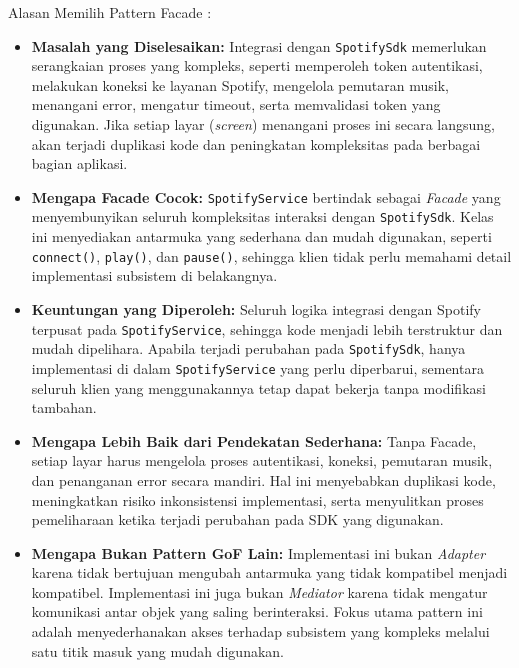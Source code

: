 \documentclass[11pt]{article}
\begin{document}
Alasan Memilih Pattern Facade :
\begin{itemize}

\item \textbf{Masalah yang Diselesaikan:} Integrasi dengan \texttt{SpotifySdk} memerlukan serangkaian proses yang kompleks, seperti memperoleh token autentikasi, melakukan koneksi ke layanan Spotify, mengelola pemutaran musik, menangani error, mengatur timeout, serta memvalidasi token yang digunakan. Jika setiap layar (\textit{screen}) menangani proses ini secara langsung, akan terjadi duplikasi kode dan peningkatan kompleksitas pada berbagai bagian aplikasi.

\item \textbf{Mengapa Facade Cocok:} \texttt{SpotifyService} bertindak sebagai \textit{Facade} yang menyembunyikan seluruh kompleksitas interaksi dengan \texttt{SpotifySdk}. Kelas ini menyediakan antarmuka yang sederhana dan mudah digunakan, seperti \texttt{connect()}, \texttt{play()}, dan \texttt{pause()}, sehingga klien tidak perlu memahami detail implementasi subsistem di belakangnya.

\item \textbf{Keuntungan yang Diperoleh:} Seluruh logika integrasi dengan Spotify terpusat pada \texttt{SpotifyService}, sehingga kode menjadi lebih terstruktur dan mudah dipelihara. Apabila terjadi perubahan pada \texttt{SpotifySdk}, hanya implementasi di dalam \texttt{SpotifyService} yang perlu diperbarui, sementara seluruh klien yang menggunakannya tetap dapat bekerja tanpa modifikasi tambahan.

\item \textbf{Mengapa Lebih Baik dari Pendekatan Sederhana:} Tanpa Facade, setiap layar harus mengelola proses autentikasi, koneksi, pemutaran musik, dan penanganan error secara mandiri. Hal ini menyebabkan duplikasi kode, meningkatkan risiko inkonsistensi implementasi, serta menyulitkan proses pemeliharaan ketika terjadi perubahan pada SDK yang digunakan.

\item \textbf{Mengapa Bukan Pattern GoF Lain:} Implementasi ini bukan \textit{Adapter} karena tidak bertujuan mengubah antarmuka yang tidak kompatibel menjadi kompatibel. Implementasi ini juga bukan \textit{Mediator} karena tidak mengatur komunikasi antar objek yang saling berinteraksi. Fokus utama pattern ini adalah menyederhanakan akses terhadap subsistem yang kompleks melalui satu titik masuk yang mudah digunakan.
\end{itemize}
\end{document}
